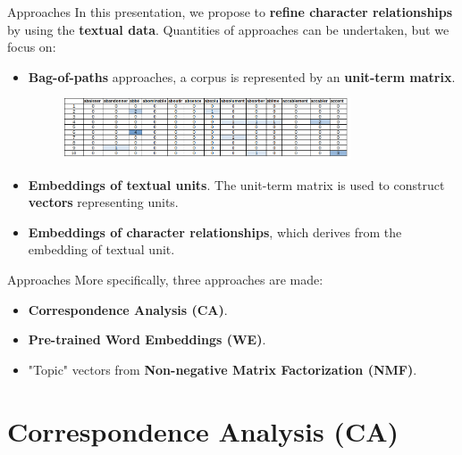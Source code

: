 \documentclass[10pt]{beamer}
\newcommand{\imp}[1]{\textbf{\color{cyan}#1}}
\begin{document}
	
	
	\begin{frame}{Approaches}
		In this presentation, we propose to \imp{refine character relationships} by using the \imp{textual data}. Quantities of approaches can be undertaken, but we focus on:
		\begin{itemize}
			\item \imp{Bag-of-paths} approaches, a corpus is represented by an \imp{unit-term matrix}. \\
			\vspace{0.3cm}
			\begin{figure}
				\centering
				\includegraphics[width=0.8\textwidth]{img/unit_term.png}
			\end{figure}
			\item \imp{Embeddings of textual units}. The unit-term matrix is used to construct \imp{vectors} representing units. 
			\item \imp{Embeddings of character relationships}, which derives from the embedding of textual unit.
		\end{itemize}
	\end{frame}
	
	
	
	\begin{frame}{Approaches}
		More specifically, three approaches are made:
		\begin{itemize}
			\item \imp{Correspondence Analysis (CA)}.
			\item \imp{Pre-trained Word Embeddings (WE)}.
			\item "Topic" vectors from \imp{Non-negative Matrix Factorization (NMF)}.
		\end{itemize}
	\end{frame}
	
	
	
	
	\section[Correspondence Analysis (CA)]{Correspondence Analysis (CA)}
	
\end{document}
